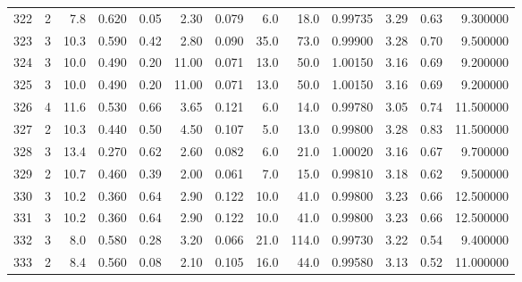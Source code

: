 \begin{tabular}{lrrrrrrrrrrrr}
322  &        2 &            7.8 &             0.620 &         0.05 &            2.30 &      0.079 &                  6.0 &                  18.0 &  0.99735 &  3.29 &       0.63 &   9.300000 \\
323  &        3 &           10.3 &             0.590 &         0.42 &            2.80 &      0.090 &                 35.0 &                  73.0 &  0.99900 &  3.28 &       0.70 &   9.500000 \\
324  &        3 &           10.0 &             0.490 &         0.20 &           11.00 &      0.071 &                 13.0 &                  50.0 &  1.00150 &  3.16 &       0.69 &   9.200000 \\
325  &        3 &           10.0 &             0.490 &         0.20 &           11.00 &      0.071 &                 13.0 &                  50.0 &  1.00150 &  3.16 &       0.69 &   9.200000 \\
326  &        4 &           11.6 &             0.530 &         0.66 &            3.65 &      0.121 &                  6.0 &                  14.0 &  0.99780 &  3.05 &       0.74 &  11.500000 \\
327  &        2 &           10.3 &             0.440 &         0.50 &            4.50 &      0.107 &                  5.0 &                  13.0 &  0.99800 &  3.28 &       0.83 &  11.500000 \\
328  &        3 &           13.4 &             0.270 &         0.62 &            2.60 &      0.082 &                  6.0 &                  21.0 &  1.00020 &  3.16 &       0.67 &   9.700000 \\
329  &        2 &           10.7 &             0.460 &         0.39 &            2.00 &      0.061 &                  7.0 &                  15.0 &  0.99810 &  3.18 &       0.62 &   9.500000 \\
330  &        3 &           10.2 &             0.360 &         0.64 &            2.90 &      0.122 &                 10.0 &                  41.0 &  0.99800 &  3.23 &       0.66 &  12.500000 \\
331  &        3 &           10.2 &             0.360 &         0.64 &            2.90 &      0.122 &                 10.0 &                  41.0 &  0.99800 &  3.23 &       0.66 &  12.500000 \\
332  &        3 &            8.0 &             0.580 &         0.28 &            3.20 &      0.066 &                 21.0 &                 114.0 &  0.99730 &  3.22 &       0.54 &   9.400000 \\
333  &        2 &            8.4 &             0.560 &         0.08 &            2.10 &      0.105 &                 16.0 &                  44.0 &  0.99580 &  3.13 &       0.52 &  11.000000 \\

\end{tabular}
